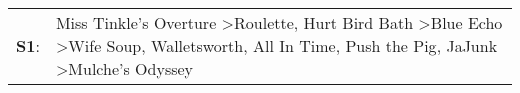 \begin{supertabular}{p{0.03\textwidth}p{0.92\textwidth}}
 \textbf{S1}:  &  Miss Tinkle's Overture\textsuperscript{} \textgreater \enspace Roulette\textsuperscript{}, \enspace Hurt Bird Bath\textsuperscript{} \textgreater \enspace Blue Echo\textsuperscript{} \textgreater \enspace Wife Soup\textsuperscript{}, \enspace Walletsworth\textsuperscript{}, \enspace All In Time\textsuperscript{}, \enspace Push the Pig\textsuperscript{}, \enspace JaJunk\textsuperscript{} \textgreater \enspace Mulche's Odyssey\textsuperscript{}  \enspace  \\
\end{supertabular}
